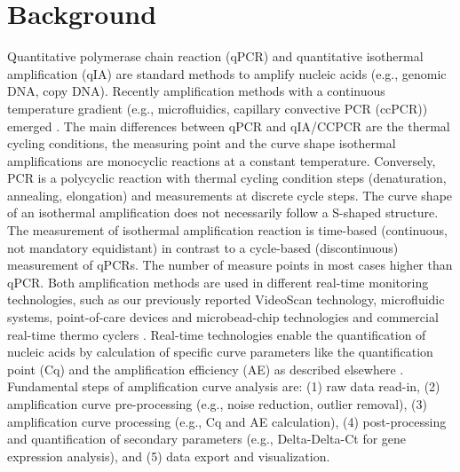 \documentclass[twocolumn]{bmcart}%
\begin{document}

\section*{Background}

Quantitative polymerase chain reaction (qPCR) and quantitative isothermal 
amplification (qIA) are standard methods to amplify nucleic acids (e.g., genomic 
DNA, copy DNA). Recently amplification methods with a continuous temperature 
gradient (e.g., microfluidics, capillary convective PCR (ccPCR)) emerged 
\cite{bustin_miqe_2009, rodiger_nucleic_2014, chou_rapid_2011}. The main 
differences between qPCR and qIA/CCPCR are the thermal cycling 
conditions, the measuring point and the curve shape isothermal amplifications 
are monocyclic reactions at a constant temperature. Conversely, PCR is a 
polycyclic reaction with thermal cycling condition steps (denaturation, 
annealing, elongation) and measurements at discrete cycle steps. The curve shape 
of an isothermal amplification does not necessarily follow a S-shaped structure. 
The measurement of isothermal amplification reaction is time-based (continuous, 
not mandatory equidistant) in contrast to a cycle-based (discontinuous) 
measurement of qPCRs. The number of measure points in most cases higher than 
qPCR. Both amplification methods are used in different real-time monitoring 
technologies, such as our previously reported VideoScan technology, microfluidic 
systems, point-of-care devices and microbead-chip technologies and commercial 
real-time thermo cyclers \cite{chang_2012, roediger_highly_2013, 
roediger_bead_qPCR_2013, rodiger_nucleic_2014}. Real-time technologies enable 
the quantification of nucleic acids by calculation of specific curve parameters 
like the quantification point (Cq) and the amplification efficiency (AE) as 
described elsewhere \cite{ruijter_2013,tellinghuisen_2014}. Fundamental steps of 
amplification curve analysis are: (1) raw data read-in, (2) amplification curve 
pre-processing (e.g., noise reduction, outlier removal), (3) amplification curve 
processing (e.g., Cq and AE calculation), (4) post-processing and quantification 
of secondary parameters (e.g., Delta-Delta-Ct for gene expression analysis), 
and (5) data export and visualization.
\end{document}
